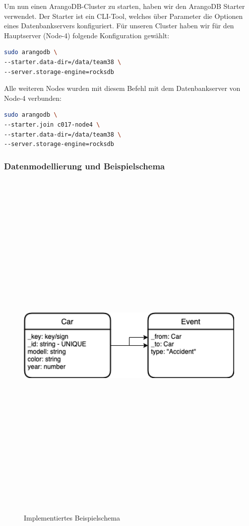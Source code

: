 Um nun einen ArangoDB-Cluster zu starten, haben wir den ArangoDB Starter verwendet. Der Starter ist ein \ac{CLI}-Tool, welches über Parameter die Optionen eines Datenbankservers konfiguriert. 
Für unseren Cluster haben wir für den Hauptserver (Node-4) folgende Konfiguration gewählt:
\begin{lstlisting}[language=bash]
sudo arangodb \
--starter.data-dir=/data/team38 \
--server.storage-engine=rocksdb
\end{lstlisting}
Alle weiteren Nodes wurden mit diesem Befehl mit dem Datenbankserver von Node-4 verbunden:
\begin{lstlisting}[language=bash]
sudo arangodb \
--starter.join c017-node4 \
--starter.data-dir=/data/team38 \
--server.storage-engine=rocksdb
\end{lstlisting}
\citep{ADB_starter}


\subsubsection{Datenmodellierung und Beispielschema}
\begin{figure}[htbp] 
  	\centering
     \includegraphics[width=1\textwidth, height=500pt, draft]{./images/schema.png}
 	\caption{Implementiertes Beispielschema}
  \label{fig:DataSchema}
\end{figure}
